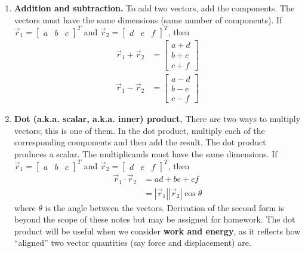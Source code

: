 \documentclass{tufte-handout}
\begin{document}
\begin{enumerate}
\item \textbf{Addition and subtraction.} To add two vectors, add the components. The vectors must have the same dimensions (same number of components). If $\vec{r}_1 = \begin{bmatrix}a&b& c\end{bmatrix}^T$ and $\vec{r}_2 = \begin{bmatrix}d&e&f\end{bmatrix}^T$, then
\begin{align}
\vec{r}_1 + \vec{r}_2 &= \begin{bmatrix}a+d\\b+e\\c+f\end{bmatrix} \\
\vec{r}_1 - \vec{r}_2 &= \begin{bmatrix}a-d\\b-e\\c-f\end{bmatrix}
\end{align}

\item \textbf{Dot (a.k.a. scalar, a.k.a. inner) product.} There are two ways to multiply vectors; this is one of them. In the dot product, multiply each of the corresponding components and then add the result. The dot product produces a scalar. The multiplicands must have the same dimensions. If $\vec{r}_1 = \begin{bmatrix}a&b& c\end{bmatrix}^T$ and $\vec{r}_2 = \begin{bmatrix}d&e&f\end{bmatrix}^T$, then
\begin{align}
\vec{r}_1 \cdot \vec{r}_2 &= ad + be + cf \\
&= | \vec{r}_1 | | \vec{r}_2 | \cos\theta
\end{align}
where $\theta$ is the angle between the vectors. Derivation of the second form is beyond the scope of these notes but may be assigned for homework. The dot product will be useful when we consider \textbf{work and energy}, as it reflects how ``aligned'' two vector quantities (say force and displacement) are. 


\end{enumerate}
\end{document}

